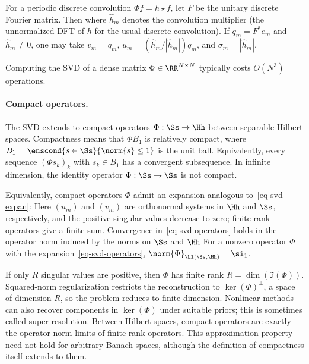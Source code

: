 For a periodic discrete convolution $\Phi f=h\star f$, let $F$ be the unitary discrete Fourier matrix. Then
where $\hat h_m$ denotes the convolution multiplier (the unnormalized DFT of $h$ for the usual discrete convolution). If $q_m=F^*e_m$ and $\hat h_m\neq0$, one may take $v_m=q_m$, $u_m=(\hat h_m/|\hat h_m|)q_m$, and $\sigma_m=|\hat h_m|$.

Computing the SVD of a dense matrix $\Phi \in \RR^{N \times N}$ typically costs $O(N^3)$ operations.

\paragraph{Compact operators.}

The SVD extends to compact operators $\Phi : \Ss \rightarrow \Hh$ between separable Hilbert spaces. Compactness means that $\Phi B_1$ is relatively compact, where $B_1=\enscond{s \in \Ss}{\norm{s}\leq 1}$ is the unit ball. Equivalently, every sequence $(\Phi s_k)_k$ with $s_k \in B_1$ has a convergent subsequence. In infinite dimension, the identity operator $\Phi : \Ss \rightarrow \Ss$ is not compact.

Equivalently, compact operators $\Phi$ admit an expansion analogous to~\eqref{eq-svd-expan}:
Here $(u_m)$ and $(v_m)$ are orthonormal systems in $\Hh$ and $\Ss$, respectively, and the positive singular values decrease to zero; finite-rank operators give a finite sum.
%
Convergence in~\eqref{eq-svd-operators} holds in the operator norm induced by the norms on $\Ss$ and $\Hh$
For a nonzero operator $\Phi$ with the expansion~\eqref{eq-svd-operators}, $\norm{\Phi}_{\Ll(\Ss,\Hh)}=\si_1$.

If only $R$ singular values are positive, then $\Phi$ has finite rank $R=\dim(\Im(\Phi))$. Squared-norm regularization restricts the reconstruction to $\ker(\Phi)^\bot$, a space of dimension $R$, so the problem reduces to finite dimension. Nonlinear methods can also recover components in $\ker(\Phi)$ under suitable priors; this is sometimes called super-resolution.
%
Between Hilbert spaces, compact operators are exactly the operator-norm limits of finite-rank operators. This approximation property need not hold for arbitrary Banach spaces, although the definition of compactness itself extends to them.

